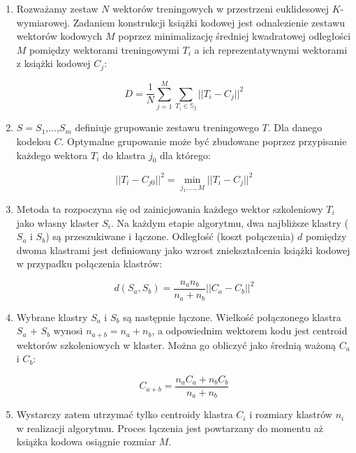 \documentclass{article}
\begin{document}
\begin{enumerate}
  \item Rozważamy zestaw $N$ wektorów treningowych w przestrzeni euklidesowej $K$-wymiarowej.
        Zadaniem konstrukcji książki kodowej jest odnalezienie zestawu wektorów kodowych $M$ poprzez minimalizację
        średniej kwadratowej odległości $M$ pomiędzy wektorami treningowymi $T_{i}$ a ich reprezentatywnymi wektorami z książki kodowej $C_{j}$:

        \begin{equation}
          D = \frac{1}{N} \sum_{j=1}^M \sum_{T_{i}\in\mathbb{S_{j}}} ||T_{i} - C_{j}||^2
        \end{equation}

  \item $S=S_{1}$,...,$S_{m}$ definiuje grupowanie zestawu treningowego $T$.
        Dla danego kodeksu $C$.
        Optymalne grupowanie może być zbudowane poprzez przypisanie każdego wektora $T_{i}$ do klastra $j_{0}$ dla którego:

        \begin{equation}
          ||T_{i} - C_{j0}||^2 = \displaystyle \min_{j_1,\dots ,M} ||T_{i} - C_{j}||^2
        \end{equation}

  \item Metoda ta rozpoczyna się od zainicjowania każdego wektor szkoleniowy $T_{i}$ jako własny klaster $S_{i}$.
        Na każdym etapie algorytmu, dwa najbliższe klastry ($S_{a}$ i $S_{b}$) są przeszukiwane i łączone.
        Odległość (koszt połączenia) $d$ pomiędzy dwoma klastrami jest definiowany jako wzrost zniekształcenia książki kodowej w przypadku połączenia klastrów:

        \begin{equation}
          d(S_{a}, S_{b}) = \frac{n_{a}n_{b}}{n_{a} + n_{b}} || C_{a} - C_{b} ||^2
        \end{equation}

  \item Wybrane klastry $S_{a}$ i $S_{b}$ są następnie łączone. Wielkość połączonego klastra $S_{a}$ + $S_{b}$ wynosi $n_{a+b} = n_{a} + n_{b}$,
        a odpowiednim wektorem kodu jest centroid wektorów szkoleniowych w klaster. Można go obliczyć jako średnią ważoną $C_{a}$ i $C_{b}$:

        \begin{equation}
          C_{a + b} = \frac{n_{a}C_{a} + n_{b}C_{b}}{n_{a} + n_{b}}
        \end{equation}
        
  \item Wystarczy zatem utrzymać tylko centroidy klastra $C_{i}$ i rozmiary klastrów $n_{i}$ w realizacji algorytmu.
        Proces łączenia jest powtarzany do momentu aż książka kodowa osiągnie rozmiar $M$. 
        
\end{enumerate}
\end{document}
